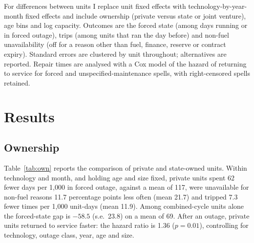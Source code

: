 \documentclass[11pt]{article}
\begin{document}
For differences between units I replace unit fixed effects with technology-by-year-month fixed effects and include ownership (private versus state or joint venture), age bins and log capacity. Outcomes are the forced state (among days running or in forced outage), trips (among units that ran the day before) and non-fuel unavailability (off for a reason other than fuel, finance, reserve or contract expiry). Standard errors are clustered by unit throughout; alternatives are reported. Repair times are analysed with a Cox model of the hazard of returning to service for forced and unspecified-maintenance spells, with right-censored spells retained.

\section{Results}

\subsection{Ownership}
Table~\ref{tab:own} reports the comparison of private and state-owned units. Within technology and month, and holding age and size fixed, private units spent 62 fewer days per 1,000 in forced outage, against a mean of 117, were unavailable for non-fuel reasons 11.7 percentage points less often (mean 21.7) and tripped 7.3 fewer times per 1,000 unit-days (mean 11.9). Among combined-cycle units alone the forced-state gap is $-58.5$ (s.e.\ 23.8) on a mean of 69. After an outage, private units returned to service faster: the hazard ratio is 1.36 ($p=0.01$), controlling for technology, outage class, year, age and size.
\end{document}
